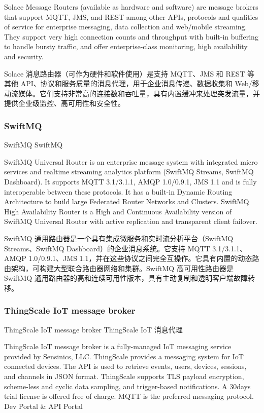 \documentclass{ctexbook}
\begin{document}
Solace Message Routers (available as hardware and software) are message brokers that support MQTT, JMS, and REST among other APIs, protocols and qualities of service for enterprise messaging, data collection and web/mobile streaming. They support very high connection counts and throughput with built-in buffering to handle bursty traffic, and offer enterprise-class monitoring, high availability and security.

Solace 消息路由器（可作为硬件和软件使用）是支持 MQTT、JMS 和 REST 等其他 API、协议和服务质量的消息代理，用于企业消息传递、数据收集和 Web/移动流媒体。它们支持非常高的连接数和吞吐量，具有内置缓冲来处理突发流量，并提供企业级监控、高可用性和安全性。

\subsubsection{SwiftMQ}
SwiftMQ SwiftMQ

SwiftMQ Universal Router is an enterprise message system with integrated micro services and realtime streaming analytics platform (SwiftMQ Streams, SwiftMQ Dashboard). It supports MQTT 3.1/3.1.1, AMQP 1.0/0.9.1, JMS 1.1 and is fully interoperable between these protocols. It has a built-in Dynamic Routing Architecture to build large Federated Router Networks and Clusters. SwiftMQ High Availability Router is a High and Continuous Availability version of SwiftMQ Universal Router with active replication and transparent client failover.

SwiftMQ 通用路由器是一个具有集成微服务和实时流分析平台（SwiftMQ Streams、SwiftMQ Dashboard）的企业消息系统。它支持 MQTT 3.1/3.1.1、AMQP 1.0/0.9.1、JMS 1.1，并在这些协议之间完全互操作。它具有内置的动态路由架构，可构建大型联合路由器网络和集群。SwiftMQ 高可用性路由器是 SwiftMQ 通用路由器的高和连续可用性版本，具有主动复制和透明客户端故障转移。

\subsubsection{ThingScale IoT message broker}
ThingScale IoT message broker ThingScale IoT 消息代理

ThingScale IoT message broker is a fully-managed IoT messaging service provided by Sensinics, LLC. ThingScale provides a messaging system for IoT connected devices. The API is used to retrieve events, users, devices, sessions, and channels in JSON format. ThingScale supports TLS payload encryption, scheme-less and cyclic data sampling, and trigger-based notifications. A 30days trial license is offered free of charge. MQTT is the preferred messaging protocol. Dev Portal \& API Portal
\end{document}
